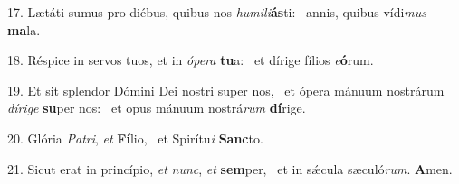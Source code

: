 17. Lætáti sumus pro diébus, quibus nos \textit{hu}\textit{mi}\textit{li}\textbf{ás}ti: \ast\  annis, quibus vídi\textit{mus} \textbf{ma}la.\

18. Réspice in servos tuos, et in \textit{ó}\textit{pe}\textit{ra} \textbf{tu}a: \ast\  et dírige fílios \textit{e}\textbf{ó}rum.\

19. Et sit splendor Dómini Dei nostri super nos, \dag\  et ópera mánuum nostrárum \textit{dí}\textit{ri}\textit{ge} \textbf{su}per nos: \ast\  et opus mánuum nostrá\textit{rum} \textbf{dí}rige.\

20. Glória \textit{Pa}\textit{tri}, \textit{et} \textbf{Fí}lio, \ast\  et Spirítu\textit{i} \textbf{Sanc}to.\

21. Sicut erat in princípio, \textit{et} \textit{nunc}, \textit{et} \textbf{sem}per, \ast\  et in sǽcula sæculó\textit{rum}. \textbf{A}men.\

